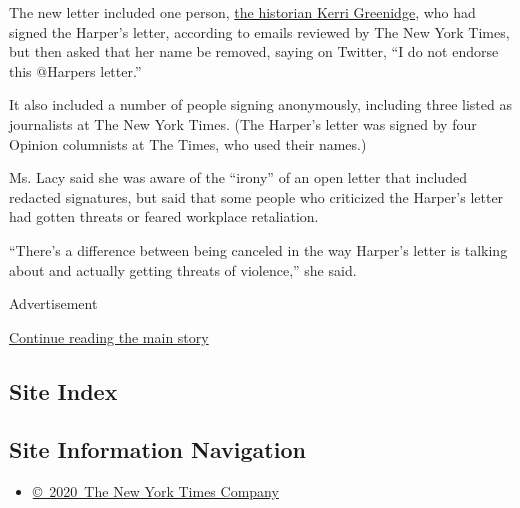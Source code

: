 The new letter included one person,
\href{https://www.nytimes.com/2019/11/13/books/review-black-radical-william-monroe-trotter-kerri-greenidge.html}{the
historian Kerri Greenidge}, who had signed the Harper's letter,
according to emails reviewed by The New York Times, but then asked that
her name be removed, saying on Twitter, ``I do not endorse this @Harpers
letter.''

It also included a number of people signing anonymously, including three
listed as journalists at The New York Times. (The Harper's letter was
signed by four Opinion columnists at The Times, who used their names.)

Ms. Lacy said she was aware of the ``irony'' of an open letter that
included redacted signatures, but said that some people who criticized
the Harper's letter had gotten threats or feared workplace retaliation.

``There's a difference between being canceled in the way Harper's letter
is talking about and actually getting threats of violence,'' she said.

Advertisement

\protect\hyperlink{after-bottom}{Continue reading the main story}

\hypertarget{site-index}{%
\subsection{Site Index}\label{site-index}}

\hypertarget{site-information-navigation}{%
\subsection{Site Information
Navigation}\label{site-information-navigation}}

\begin{itemize}
\tightlist
\item
  \href{https://help.nytimes.com/hc/en-us/articles/115014792127-Copyright-notice}{©~2020~The
  New York Times Company}
\end{itemize}

